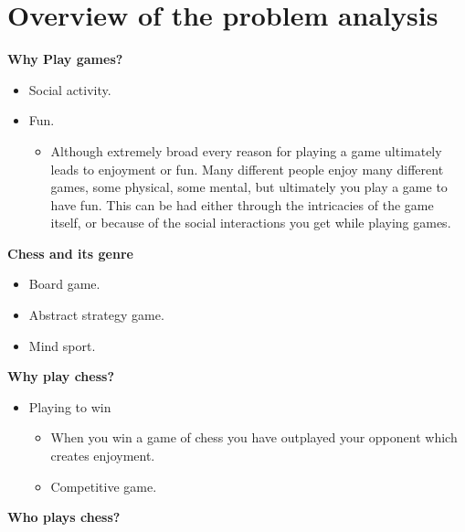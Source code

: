 \section{Overview of the problem analysis}\label{sec:overview}

\textbf{Why Play games?}

\begin{itemize}
    \item Social activity.
    \item Fun.
    \begin{itemize}
        \item Although extremely broad every reason for playing a game ultimately leads to enjoyment or fun.
        Many different people enjoy many different games, some physical, some mental,
        but ultimately you play a game to have fun.
        This can be had either through the intricacies of the game itself,
        or because of the social interactions you get while playing games.
    \end{itemize}
\end{itemize}

\textbf{Chess and its genre}

\begin{itemize}
    \item Board game.
    \item Abstract strategy game.
    \item Mind sport.
\end{itemize}

\textbf{Why play chess?}

\begin{itemize}
    \item Playing to win
    \begin{itemize}
        \item When you win a game of chess you have outplayed
        your opponent which creates enjoyment.
        \item Competitive game.
    \end{itemize}
\end{itemize}

\textbf{Who plays chess?}

